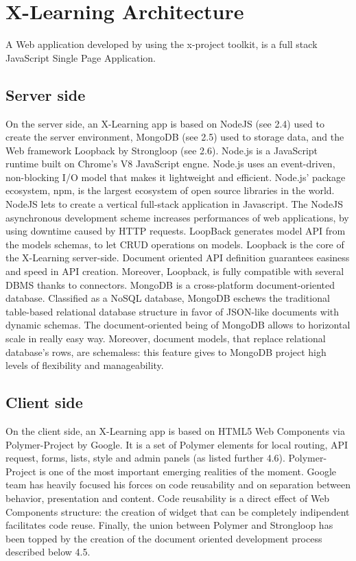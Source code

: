 \section{X-Learning  Architecture}
\label{sec:x-learning_architecture}

A Web application developed by using the x-project toolkit, is a full stack JavaScript  Single  Page Application.


\subsection{Server side}
\label{subsec:server_side}

On the server side, an X-Learning app is based on NodeJS (see 2.4) used to create the server environment, MongoDB (see 2.5) used to storage data, and the Web framework Loopback by Strongloop (see 2.6).
Node.js is a JavaScript runtime built on Chrome’s  V8  JavaScript  engne. Node.js uses an event-driven, non-blocking I/O model that makes it lightweight and efficient. Node.js’ package ecosystem, npm, is the largest ecosystem of open source libraries in the world. NodeJS lets to create a vertical full-stack application in Javascript. The NodeJS asynchronous development scheme increases performances of web applications, by using downtime caused  by  HTTP requests.
LoopBack generates model API from the models schemas, to let CRUD operations on models. Loopback is the core of the X-Learning server-side. Document oriented API definition guarantees easiness and speed in API creation. Moreover, Loopback, is fully compatible with several DBMS thanks to connectors.
MongoDB is a cross-platform document-oriented database.  Classified as a NoSQL database, MongoDB eschews the traditional table-based relational database structure in favor of JSON-like documents with dynamic schemas. The document-oriented being of MongoDB allows to horizontal scale in really easy way. Moreover, document models, that replace relational database’s rows, are schemaless: this feature gives to MongoDB project high levels of flexibility and manageability.

\subsection{Client side}
\label{subsec:client_side}

On the client side, an X-Learning app is based on HTML5 Web Components via Polymer-Project by Google. It is a set of Polymer elements for local routing, API request, forms, lists, style and admin panels (as listed further    4.6).
Polymer-Project is one of the most important emerging realities of the moment. Google team has heavily focused his forces on code reusability and on separation between behavior, presentation and content.  Code reusability is a direct effect of Web Components structure: the creation of widget that can be completely indipendent facilitates code reuse.
Finally, the union between Polymer and Strongloop has been topped by the creation of the document oriented development process described below 4.5.